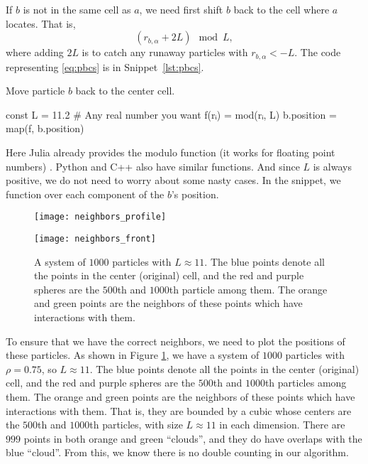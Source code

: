 If $b$ is not in the same cell as $a$, we need first shift $b$ back to the cell where
$a$ locates. That is,
%
\begin{equation}\label{eq:pbcs}
    (r_{b, \alpha} + 2L) \mod L,
\end{equation}
%
where adding $2L$ is to catch any runaway particles\cite{Adrian} with $r_{b, \alpha} < -L$.
The code representing \eqref{eq:pbcs} is in Snippet~\ref{lst:pbcs}.
%
\begin{algorithm}
    \caption{Move particle $b$ back to the center cell.}
    \label{lst:pbcs}
    \begin{juliacode}
        const L = 11.2  # Any real number you want
        f(rᵢ) = mod(rᵢ, L)
        b.position = map(f, b.position)
    \end{juliacode}
\end{algorithm}
%
Here Julia already provides the modulo function (it works for floating point numbers)
\href{https://docs.julialang.org/en/v1/base/math/#Base.mod}{}. Python and C++
also have similar functions. And since $L$ is always positive, we do not need to worry
about some nasty cases.
In the snippet, we  function  over
each component of the $b$'s position.

\begin{figure} %
    \centering
    \begin{minipage}[t]{0.5\linewidth}
        \centering
        \texttt{[image: neighbors\_profile]}
        \label{fig:neighbors:a}
    \end{minipage}
    \hfill
    \begin{minipage}[t]{0.5\linewidth}
        \centering
        \texttt{[image: neighbors\_front]}
        \label{fig:neighbors:b}
    \end{minipage}
    \caption{A system of $1000$ particles with $L \approx 11$. The blue points denote all
        the points in the center (original) cell, and the red and purple spheres are the
        $500$th and $1000$th particle among them. The orange and green points are the
        neighbors of these points which have interactions with them.}
    \label{fig:neighbors}
\end{figure}

To ensure that we have the correct neighbors, we need to plot the positions of these particles.
As shown in Figure \ref{fig:neighbors}, we have a system of $1000$ particles with
$\rho = 0.75$, so $L \approx 11$. The blue points denote all
the points in the center (original) cell, and the red and purple spheres are the
$500$th and $1000$th particles among them. The orange and green points are the
neighbors of these points which have interactions with them. That is, they are bounded by a
cubic whose centers are the $500$th and $1000$th particles,
with size $L \approx 11$ in each dimension.
There are $999$ points in both orange and green ``clouds'', and they do have overlaps
with the blue ``cloud''. From this, we know there is no double counting in our algorithm.

